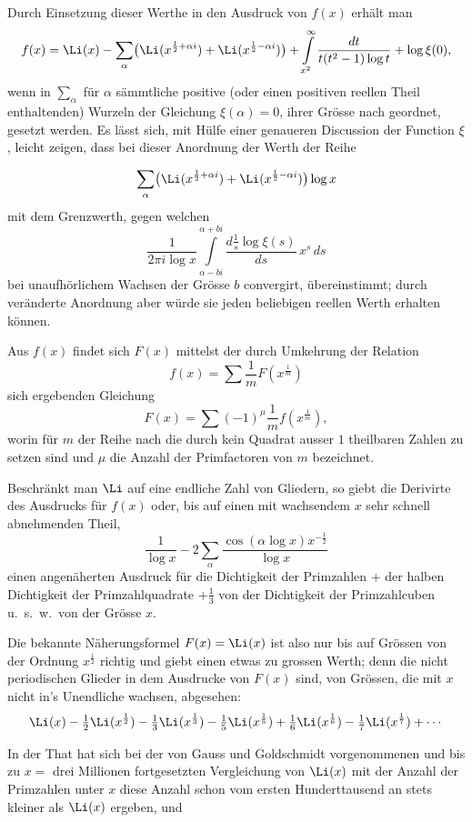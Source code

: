 \documentclass[12pt,a4paper]{book}
\theoremstyle{definition}
\theoremstyle{remark}
\begin{document}
Durch Einsetzung dieser Werthe in den Ausdruck von $f(x)$ erh\"alt man
\[
f(x) = \Li(x) - \sum_{\alpha}\bigl(\Li(x^{\frac{1}{2}+\alpha i}) + \Li(x^{\frac{1}{2}-\alpha i})\bigr) + \int\limits_{x^{2}}^{\infty}\frac{dt}{t(t^{2}-1)\log t} + \log\xi(0),
\]
 wenn in $\sum_{\alpha}$ f\"ur $\alpha$ s\"ammtliche positive (oder einen positiven reellen Theil enthaltenden) Wurzeln der Gleichung $\xi(\alpha) = 0$, ihrer Gr\"osse nach geordnet, gesetzt werden. Es l\"asst sich, mit H\"ulfe einer genaueren Discussion der Function $\xi$, leicht zeigen, dass bei dieser Anordnung der Werth der Reihe

\[
\sum_{\alpha}\bigl(\Li(x^{\frac{1}{2}+\alpha i}) + \Li(x^{\frac{1}{2}-\alpha i})\bigr)\log x
\]
mit dem Grenzwerth, gegen welchen
\[
\frac{1}{2\pi i\log x} \int\limits_{\alpha-bi}^{\alpha+bi} \frac{d\frac{1}{s}\log\xi(s)}{ds}\,x^{s}\,ds
\]
bei unaufh\"orlichem Wachsen der Gr\"osse $b$ convergirt, \"ubereinstimmt; durch ver\"anderte Anordnung aber w\"urde sie jeden beliebigen reellen Werth erhalten k\"onnen.

Aus $f(x)$ findet sich $F(x)$ mittelst der durch Umkehrung der Relation
\[
f(x) = \sum\frac{1}{m}F(x^{\frac{1}{m}})
\]
sich ergebenden Gleichung
\[
F(x) = \sum(-1)^{\mu}\frac{1}{m}f(x^{\frac{1}{m}}),
\]
worin f\"ur $m$ der Reihe nach die durch kein Quadrat ausser $1$ theilbaren Zahlen zu setzen sind und $\mu$ die Anzahl der Primfactoren von $m$ bezeichnet.

Beschr\"ankt man $\Li$ auf eine endliche Zahl von Gliedern, so giebt die Derivirte des Ausdrucks f\"ur $f(x)$ oder, bis auf einen mit wachsendem $x$ sehr schnell abnehmenden Theil,
\[
\frac{1}{\log x} - 2\sum_{\alpha}\frac{\cos(\alpha\log x)x^{-\frac{1}{2}}}{\log x}
\]
einen angen\"aherten Ausdruck f\"ur die Dichtigkeit der Primzahlen $+$ der halben Dichtigkeit der Primzahlquadrate $+\frac{1}{3}$ von der Dichtigkeit der Primzahlcuben u.~s.~w.~von der Gr\"osse $x$.

Die bekannte N\"aherungsformel $F(x) = \Li(x)$ ist also nur bis auf Gr\"ossen von der Ordnung $x^{\frac{1}{2}}$ richtig und giebt einen etwas zu grossen Werth; denn die nicht periodischen Glieder in dem Ausdrucke von $F(x)$ sind, von Gr\"ossen, die mit $x$ nicht in's Unendliche wachsen, abgesehen:
\[
\Li(x) - \tfrac{1}{2}\Li(x^{\frac{1}{2}}) - \tfrac{1}{3}\Li(x^{\frac{1}{3}}) - \tfrac{1}{5}\Li(x^{\frac{1}{5}}) + \tfrac{1}{6}\Li(x^{\frac{1}{6}}) - \tfrac{1}{7}\Li(x^{\frac{1}{7}}) + \cdots
\]

In der That hat sich bei der von Gauss und Goldschmidt vorgenommenen und bis zu $x =$ drei Millionen fortgesetzten Vergleichung von $\Li(x)$ mit der Anzahl der Primzahlen unter $x$ diese Anzahl schon vom ersten Hunderttausend an stets kleiner als $\Li(x)$ ergeben, und
\end{document}
